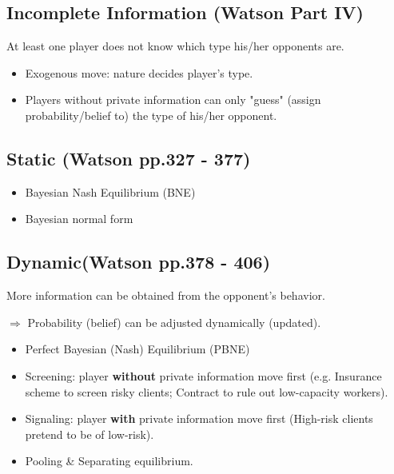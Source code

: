 \documentclass{article}
\begin{document}
\begin{mdframed}[backgroundcolor=blue!20,linecolor=white]
\section*{Incomplete Information (Watson Part IV)}
At least one player does not know which type his/her opponents are.

\begin{itemize}
\item Exogenous move: nature decides player's type.
\item Players without private information can only "guess" (assign probability/belief to) the type of his/her opponent.
\end{itemize}
\subsection*{\hspace{4mm} Static (Watson pp.327 - 377)}
\begin{itemize}
\item Bayesian Nash Equilibrium (BNE)
\item Bayesian normal form

\end{itemize}

\subsection*{\hspace{4mm} Dynamic(Watson pp.378 - 406)}
\hspace{4mm} More information can be obtained from the opponent's behavior.

\hspace{4mm}  $\Rightarrow$ Probability (belief) can be adjusted dynamically (updated).
\begin{itemize}
\item Perfect Bayesian (Nash) Equilibrium (PBNE)
\item Screening: player \textbf{without} private information move first (e.g. Insurance scheme to screen risky clients; Contract to rule out low-capacity workers).
\item Signaling: player \textbf{with} private information move first (High-risk clients pretend to be of low-risk).
\item Pooling \& Separating equilibrium.
\end{itemize}

\end{mdframed}
\end{document}
